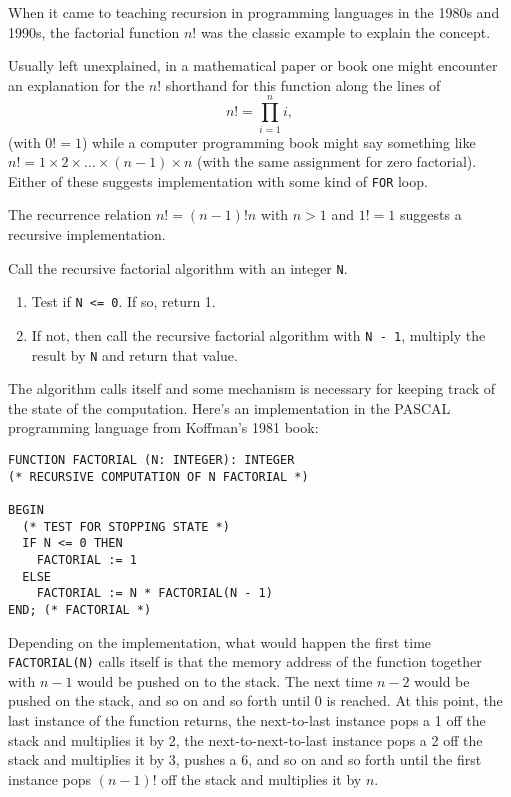 \documentclass[12pt]{article}
\begin{document}

When it came to teaching recursion in programming languages in the 1980s and 1990s, the factorial function $n!$ was the classic example to explain the concept.

Usually left unexplained, in a mathematical paper or book one might encounter an explanation for the $n!$ shorthand for this function along the lines of $$n! = \prod_{i = 1}^n i,$$ (with $0! = 1$) while a computer programming book might say something like $n! = 1 \times 2 \times \ldots \times (n - 1) \times n$ (with the same assignment for zero factorial). Either of these suggests implementation with some kind of \verb=FOR= loop.

The recurrence relation $n! = (n - 1)!n$ with $n > 1$ and $1! = 1$ suggests a recursive implementation.

Call the recursive factorial algorithm with an integer \verb=N=.

\begin{enumerate}
\item Test if \verb'N <= 0'. If so, return 1.
\item If not, then call the recursive factorial algorithm with \verb=N - 1=, multiply the result by \verb=N= and return that value.
\end{enumerate}

The algorithm calls itself and some mechanism is necessary for keeping track of the state of the computation. Here's an implementation in the PASCAL programming language from Koffman's 1981 book:

\begin{verbatim}
FUNCTION FACTORIAL (N: INTEGER): INTEGER
(* RECURSIVE COMPUTATION OF N FACTORIAL *)

BEGIN
  (* TEST FOR STOPPING STATE *)
  IF N <= 0 THEN
    FACTORIAL := 1
  ELSE
    FACTORIAL := N * FACTORIAL(N - 1)
END; (* FACTORIAL *)
\end{verbatim}

Depending on the implementation, what would happen the first time \verb=FACTORIAL(N)= calls itself is that the memory address of the function together with $n - 1$ would be pushed on to the stack. The next time $n - 2$ would be pushed on the stack, and so on and so forth until 0 is reached. At this point, the last instance of the function returns, the next-to-last instance pops a 1 off the stack and multiplies it by 2, the next-to-next-to-last instance pops a 2 off the stack and multiplies it by 3, pushes a 6, and so on and so forth until the first instance pops $(n - 1)!$ off the stack and multiplies it by $n$.
\end{document}
